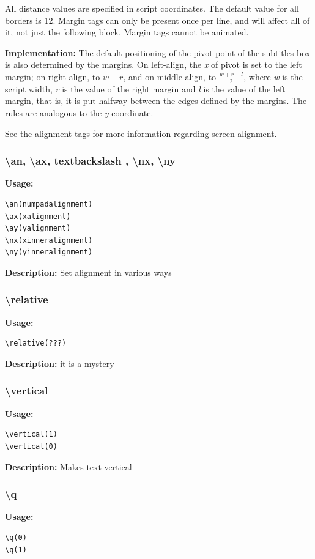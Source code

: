 \documentclass{spec}
\begin{document}
All distance values are specified in script coordinates. The default value for all borders is 12.
Margin tags can only be present once per line, and will affect all of it, not just the following
block. Margin tags cannot be animated.

\textbf{Implementation:}
The default positioning of the pivot point of the subtitles box is also determined by the margins.
On left-align, the \emph{x} of pivot is set to the left margin; on right-align, to $w - r$,
and on middle-align, to $\frac{w + r - l}{2}$, where \emph{w} is the script width, \emph{r} is
the value of the right margin and \emph{l} is the value of the left margin, that is, it is put
halfway between the edges defined by the margins. The rules are analogous to the \emph{y} coordinate.

See the alignment tags for more information regarding screen alignment.

\subsubsection{\textbackslash an, \textbackslash ax, textbackslash \ay, \textbackslash nx, \textbackslash ny}
\textbf{Usage:}
\begin{verbatim}
\an(numpadalignment)
\ax(xalignment)
\ay(yalignment)
\nx(xinneralignment)
\ny(yinneralignment)
\end{verbatim}

\textbf{Description:}
Set alignment in various ways

\subsubsection{\textbackslash relative}
\textbf{Usage:}
\begin{verbatim}
\relative(???)
\end{verbatim}

\textbf{Description:}
it is a mystery

\subsubsection{\textbackslash vertical}
\textbf{Usage:}
\begin{verbatim}
\vertical(1)
\vertical(0)
\end{verbatim}

\textbf{Description:}
Makes text vertical

\subsubsection{\textbackslash q}
\textbf{Usage:}
\begin{verbatim}
\q(0)
\q(1)
\end{verbatim}
\end{document}
